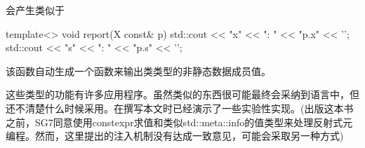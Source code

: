 会产生类似于

\begin{cpp}
template<> void report(X const& p) {
	std::cout << "x" << ": " << "p.x" << ’\n’;
	std::cout << "s" << ": " << "p.s" << ’\n’;
}
\end{cpp}

该函数自动生成一个函数来输出类类型的非静态数据成员值。

这些类型的功能有许多应用程序。虽然类似的东西很可能最终会采纳到语言中，但还不清楚什么时候采用。在撰写本文时已经演示了一些实验性实现。(出版这本书之前，SG7同意使用constexpr求值和类似std::meta::info的值类型来处理反射式元编程。然而，这里提出的注入机制没有达成一致意见，可能会采取另一种方式)

























